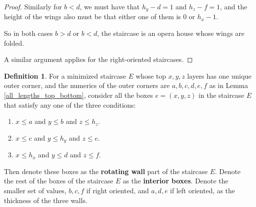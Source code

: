 \documentclass{amsart}[10pt]
\theoremstyle{plain}
\theoremstyle{definition}
\newtheorem{definition}[theorem]{Definition}
\begin{document}
\begin{proof}
Similarly for $b<d$, we must have that $h_y-d=1$ and $h_z-f=1$, and the height of the wings also must be that either one of them is $0$ or $h_x-1$.

So in both cases $b>d$ or $b<d$, the staircase is an opera house whose wings are folded. 



 



A similar argument applies for the right-oriented staircases.
\end{proof}



\begin{definition}
For a minimized staircase $E$ whose top $x,y,z$ layers has one unique outer corner, and the numerics of the outer corners are $a,b,c,d,e,f$ as in Lemma \ref{all_lengths_top_bottom}, consider all the boxes $e=(x,y,z)$ in the staircase $E$ that satisfy any one of the three conditions:
\begin{enumerate}
\item $x \leq a$ and  $y \leq b$ and  $z \leq h_z$.

\item $x \leq c$ and  $y \leq h_y$ and  $z \leq e$.

\item $x \leq h_x$ and  $y \leq d$ and  $z \leq f$.
\end{enumerate}

Then denote these boxes as the \textbf{rotating wall} part of the staircase $E$. Denote the rest of the boxes of the staircase $E$ as the \textbf{interior boxes}. Denote the smaller set of values, $b,c,f$ if right oriented, and $a,d,e$ if left oriented, as the thickness of the three walls.
\end{definition}
\end{document}
